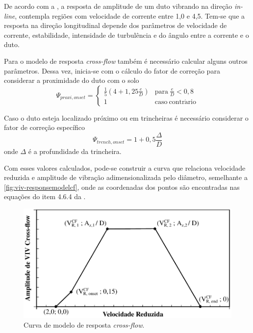 De acordo com a , a resposta de amplitude de um duto vibrando na direção \textit{in-line}, contempla regiões com velocidade de corrente entre 1,0 e 4,5.
Tem-se que a resposta na direção longitudinal depende dos parâmetros de velocidade de corrente, estabilidade, intensidade de turbulência e do ângulo entre a corrente e o duto.

Para o modelo de resposta \textit{cross-flow} também  é necessário calcular alguns outros parâmetros. Dessa vez, inicia-se com o cálculo do fator de correção para considerar a proximidade do duto com o solo
\begin{equation}
\label{eq:viv-Psi}
\Psi_{\mathit{proxi}, \mathit{onset}} =
\begin{cases}
\frac{1}{5}\left(4 + 1,25\frac{e}{D} \right) & \mathrm{para}~\frac{e}{D} < 0,8\\
1                                            & \mathrm{caso~contr\acute{a}rio}
\end{cases}
\end{equation}

Caso o duto esteja localizado próximo ou em trincheiras é necessário considerar o fator de correção específico
\begin{equation}
\label{eq:viv-Psitren}
\Psi_{\mathit{trench}, \mathit{onset}} = 1 + 0,5\frac{\Delta}{D}
\end{equation}
onde $\Delta$ é a profundidade da trincheira.

Com esses valores calculados, pode-se construir a curva que relaciona velocidade reduzida e amplitude de vibração adimensionalizada pelo diâmetro, semelhante a \autoref{fig:viv-responsemodelcf}, onde as coordenadas dos pontos são encontradas nas equações do item 4.6.4 da .

\begin{figure}[!ht]
    \centering
    \caption{Curva de modelo de resposta \textit{cross-flow}.}\label{fig:viv-responsemodelcf}
    \includegraphics[width=0.65\linewidth]{imagens/response_model_CF}
\end{figure}


